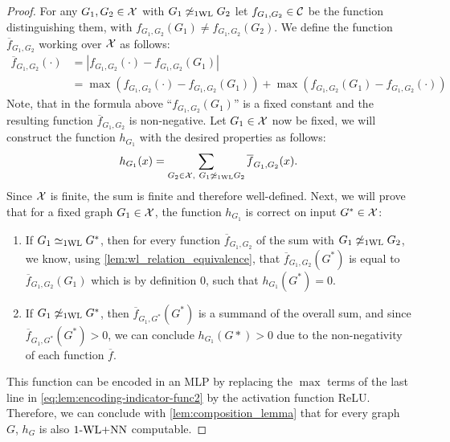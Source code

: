 \begin{proof}
    For any $G_1, G_2 \in \mathcal{X}$ with $G_1 \not\simeq_{\text{1WL}} G_2$ let $f_{G_1, G_2} \in \mathcal{C}$ be the function distinguishing them, with $f_{G_1, G_2}(G_1) \neq f_{G_1, G_2}(G_2)$. We define the function $\overline{f}_{G_1,G_2}$ working over $\mathcal{X}$ as follows:
    \begin{align}\label{eq:lem:encoding-indicator-func2}
        \overline{f}_{G_1, G_2}(\cdot) &= |f_{G_1, G_2}(\cdot) - f_{G_1, G_2}(G_1)| \nonumber \nonumber\\
        &= \max(f_{G_1, G_2}(\cdot) - f_{G_1, G_2}(G_1)) + \max(f_{G_1, G_2}(G_1) - f_{G_1, G_2}(\cdot))
    \end{align}
    Note, that in the formula above ``$f_{G_1, G_2}(G_1)$'' is a fixed constant and the resulting function $\overline{f}_{G_1, G_2}$ is non-negative.
    Let $G_1 \in \mathcal{X}$ now be fixed, we will construct the function $h_{G_1}$ with the desired properties as follows:
    \begin{align*}
        h_{G_1}(x) = \sum_{G_2 \in \mathcal{X}, \ G_1 \not\simeq_{\text{1WL}} G_2} \overline{f}_{G_1, G_2}(x).
    \end{align*}
    Since $\mathcal{X}$ is finite, the sum is finite and therefore well-defined. Next, we will prove that for a fixed graph $G_1 \in \mathcal{X}$, the function $h_{G_1}$ is correct on input $G^* \in \mathcal{X}$:
    \begin{enumerate}
        \item If $G_1 \simeq_{\text{1WL}} G^*$, then for every function $\overline{f}_{G_1, G_2}$ of the sum with $G_1 \not\simeq_{\text{1WL}} G_2$, we know, using \cref{lem:wl_relation_equivalence}, that $\overline{f}_{G_1, G_2}(G^*)$ is equal to $\overline{f}_{G_1, G_2}(G_1)$ which is by definition $0$, such that $h_{G_1}(G^*) = 0$.
        \item If $G_1 \not\simeq_{\text{1WL}} G^*$, then $\overline{f}_{G_1, G^*}(G^*)$ is a summand of the overall sum, and since $\overline{f}_{G_1, G^*}(G^*) > 0$, 
        we can conclude $h_{G_1}(G*) > 0$ due to the non-negativity of each function $\overline{f}$.
    \end{enumerate}

    This function can be encoded in an MLP by replacing the $\max$ terms of the last line in \autoref{eq:lem:encoding-indicator-func2} by the activation function ReLU. Therefore, we can conclude with \cref{lem:composition_lemma} that for every graph $G$, $h_G$ is also $\text{1-WL+NN}$ computable.
\end{proof}


